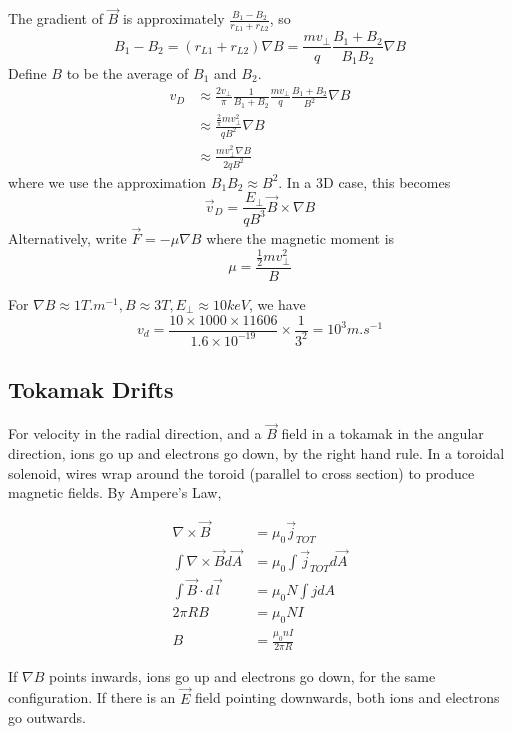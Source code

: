 \documentclass[12pt]{article}
\begin{document}
The gradient of $\vec B$ is approximately $\frac{B_1 - B_2}{r_{L1} + r_{L2}}$, so
$$B_1 - B_2 = (r_{L1} + r_{L2})\nabla B = \frac{mv_\perp}{q} \frac{B_1 + B_2}{B_1B_2}\nabla B$$
Define $B$ to be the average of $B_1$ and $B_2$.
\begin{align*}
    v_D &\approx \frac{2v_\perp}{\pi} \frac{1}{B_1+B_2} \frac{mv_\perp}{q} \frac{B_1 + B_2}{B^2}\nabla B \\
        &\approx \frac{\frac{2}{\pi} mv_\perp^2}{qB^2} \nabla B \\
        &\approx \frac{mv_\perp^2\nabla B}{2qB^2}
\end{align*}
where we use the approximation $B_1B_2 \approx B^2$. In a 3D case, this becomes
$$\vec v_D = \frac{E_\perp}{qB^3} \vec B \times \nabla B$$
Alternatively, write $\vec F = -\mu\nabla B$ where the magnetic moment is
$$\mu = \frac{\frac{1}{2}mv_\perp^2}{B}$$

\begin{ex}
    For $\nabla B \approx 1\unit{T.m^{-1}}, B \approx 3\unit{T}, E_\perp \approx 10\unit{keV}$, we have
    $$v_d = \frac{10 \times 1000 \times 11606}{1.6 \times 10^{-19}} \times \frac{1}{3^2} = 10^3 \unit{m.s^{-1}}$$
\end{ex}

\subsection{Tokamak Drifts}

For velocity in the radial direction, and a $\vec B$ field in a tokamak in the angular direction, ions go up and electrons go down, by the right hand rule. In a toroidal solenoid, wires wrap around the toroid (parallel to cross section) to produce magnetic fields. By Ampere's Law,

\begin{align*}
    \nabla \times \vec B &= \mu_0 \vec j_{TOT} \\
    \int \nabla \times \vec B d\vec A &= \mu_0 \int \vec j_{TOT} d\vec A \\
    \int \vec B \cdot d\vec l &= \mu_0 N \int jdA \\
    2\pi RB &= \mu_0 NI \\
    B &= \frac{\mu_0 nI}{2\pi R}
\end{align*}

If $\nabla B$ points inwards, ions go up and electrons go down, for the same configuration. If there is an $\vec E$ field pointing downwards, both ions and electrons go outwards.
\end{document}

